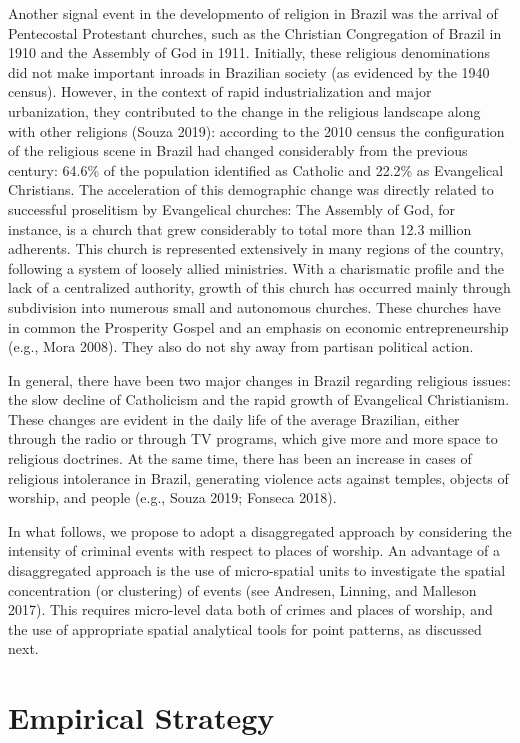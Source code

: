 \documentclass[smallextended]{svjour3}       %
\begin{document}
Another signal event in the developmento of religion in Brazil was the
arrival of Pentecostal Protestant churches, such as the Christian
Congregation of Brazil in 1910 and the Assembly of God in 1911.
Initially, these religious denominations did not make important inroads
in Brazilian society (as evidenced by the 1940 census). However, in the
context of rapid industrialization and major urbanization, they
contributed to the change in the religious landscape along with other
religions (Souza 2019): according to the 2010 census the configuration
of the religious scene in Brazil had changed considerably from the
previous century: 64.6\% of the population identified as Catholic and
22.2\% as Evangelical Christians. The acceleration of this demographic
change was directly related to successful proselitism by Evangelical
churches: The Assembly of God, for instance, is a church that grew
considerably to total more than 12.3 million adherents. This church is
represented extensively in many regions of the country, following a
system of loosely allied ministries. With a charismatic profile and the
lack of a centralized authority, growth of this church has occurred
mainly through subdivision into numerous small and autonomous churches.
These churches have in common the Prosperity Gospel and an emphasis on
economic entrepreneurship (e.g., Mora 2008). They also do not shy away
from partisan political action.

In general, there have been two major changes in Brazil regarding
religious issues: the slow decline of Catholicism and the rapid growth
of Evangelical Christianism. These changes are evident in the daily life
of the average Brazilian, either through the radio or through TV
programs, which give more and more space to religious doctrines. At the
same time, there has been an increase in cases of religious intolerance
in Brazil, generating violence acts against temples, objects of worship,
and people (e.g., Souza 2019; Fonseca 2018).

In what follows, we propose to adopt a disaggregated approach by
considering the intensity of criminal events with respect to places of
worship. An advantage of a disaggregated approach is the use of
micro-spatial units to investigate the spatial concentration (or
clustering) of events (see Andresen, Linning, and Malleson 2017). This
requires micro-level data both of crimes and places of worship, and the
use of appropriate spatial analytical tools for point patterns, as
discussed next.

\hypertarget{methods}{%
\section{Empirical Strategy}\label{methods}}
\end{document}
